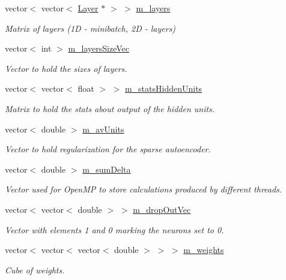 \begin{DoxyCompactItemize}
vector$<$ vector$<$ \hyperlink{classLayer}{Layer} $\ast$ $>$ $>$ \hyperlink{classNeuralNetwork_ab2bc4d407ef6b85a0089aaaa600e0fb8}{m\+\_\+layers}
\begin{DoxyCompactList}\small\item\em Matrix of layers (1D -\/ minibatch, 2D -\/ layers) \end{DoxyCompactList}\item 
vector$<$ int $>$ \hyperlink{classNeuralNetwork_a91b00cd0bb975be91e76eb13ffcfe78f}{m\+\_\+layers\+Size\+Vec}
\begin{DoxyCompactList}\small\item\em Vector to hold the sizes of layers. \end{DoxyCompactList}\item 
vector$<$ vector$<$ float $>$ $>$ \hyperlink{classNeuralNetwork_a15f7c03ca694dadc97a4290711ca2101}{m\+\_\+stats\+Hidden\+Units}
\begin{DoxyCompactList}\small\item\em Matrix to hold the stats about output of the hidden units. \end{DoxyCompactList}\item 
vector$<$ double $>$ \hyperlink{classNeuralNetwork_a257969584b79a83070b07462b1ec7fb2}{m\+\_\+av\+Units}
\begin{DoxyCompactList}\small\item\em Vector to hold regularization for the sparse autoencoder. \end{DoxyCompactList}\item 
vector$<$ double $>$ \hyperlink{classNeuralNetwork_ac447314a2315cd10f63b0b330857024a}{m\+\_\+sum\+Delta}
\begin{DoxyCompactList}\small\item\em Vector used for Open\+MP to store calculations produced by different threads. \end{DoxyCompactList}\item 
vector$<$ vector$<$ double $>$ $>$ \hyperlink{classNeuralNetwork_a456d6c273c0bd4f160f4d20f8b26f37b}{m\+\_\+drop\+Out\+Vec}
\begin{DoxyCompactList}\small\item\em Vector with elements 1 and 0 marking the neurons set to 0. \end{DoxyCompactList}\item 
vector$<$ vector$<$ vector$<$ double $>$ $>$ $>$ \hyperlink{classNeuralNetwork_ad489169464f3a6e827e6fb5de4419061}{m\+\_\+weights}
\begin{DoxyCompactList}\small\item\em Cube of weights. \end{DoxyCompactList}\item 

\end{DoxyCompactItemize}
